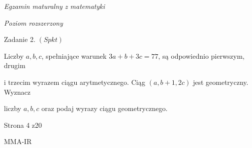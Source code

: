 \documentclass[a4paper,12pt]{article}
\begin{document}
{\it Egzamin maturalny z matematyki}

{\it Poziom rozszerzony}

Zadanie 2. $(Spkt)$

Liczby $a, b, c$, spełniające warunek $3a+b+3c=77$, są odpowiednio pierwszym, drugim

i trzecim wyrazem ciągu arytmetycznego. Ciąg $(a,b+1,2c)$ jest geometryczny. Wyznacz

liczby $a, b, c$ oraz podaj wyrazy ciągu geometrycznego.

Strona 4 z20

MMA-IR
\end{document}
